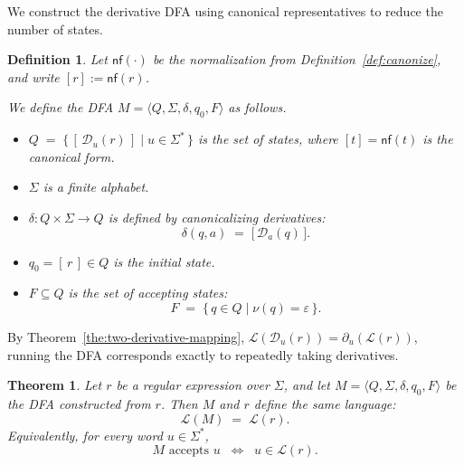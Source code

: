 \documentclass{article}
\newtheorem{definition}{Definition}[section]
\newtheorem{theorem}{Theorem}[section]
\begin{document}
We construct the derivative DFA using canonical representatives to reduce the number of states.
\begin{definition}
Let $\mathsf{nf}(\cdot)$ be the normalization from Definition~\ref{def:canonize},
and write $[r] := \mathsf{nf}(r)$.

We define the DFA $M=\langle Q, \Sigma, \delta, q_0, F\rangle$ as follows.

\begin{itemize}
  \item $Q \;=\; \{\, [\,\mathcal{D}_u(r)\,] \mid u \in \Sigma^* \,\}$ is the set of states,
        where $[t]=\mathsf{nf}(t)$ is the canonical form.

  \item $\Sigma$ is a finite alphabet.

  \item $\delta: Q \times \Sigma \to Q$ is defined by canonicalizing derivatives:
        \[
          \delta(q,a) \;=\; \bigl[\,\mathcal{D}_a(q)\,\bigr].
        \]

  \item $q_0 = [\,r\,] \in Q$ is the initial state.

  \item $F \subseteq Q$ is the set of accepting states:
        \[
          F \;=\; \{\, q \in Q \mid \nu(q)=\varepsilon \,\}.
        \]
\end{itemize}
\end{definition}



By Theorem~\ref{the:two-derivative-mapping},
$\mathcal{L}(\mathcal{D}_u(r))=\partial_u(\mathcal{L}(r))$, running the DFA corresponds exactly to repeatedly taking derivatives.

\begin{theorem}\label{the:dfa-correctness}
Let $r$ be a regular expression over $\Sigma$, and let
$M = \langle Q, \Sigma, \delta, q_0, F \rangle$
be the DFA constructed from $r$.
Then $M$ and $r$ define the same language:
\[
  \mathcal{L}(M) \;=\; \mathcal{L}(r).
\]
Equivalently, for every word $u \in \Sigma^*$,
\[
  M \text{ accepts } u
  \;\;\Longleftrightarrow\;\;
  u \in \mathcal{L}(r).
\]
\end{theorem}
\end{document}
